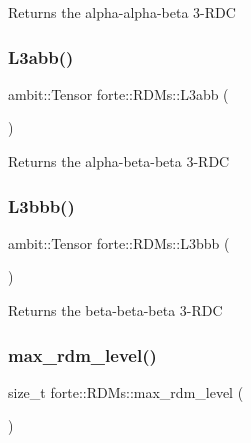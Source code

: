 \begin{DoxyReturn}{Returns}
the alpha-\/alpha-\/beta 3-\/\+R\+DC 
\end{DoxyReturn}
\mbox{\label{classforte_1_1_r_d_ms_a6e86cf45f7e726c9c9a71848d1d6bfa7}} 
\subsubsection{\texorpdfstring{L3abb()}{L3abb()}}
{\footnotesize\ttfamily ambit\+::\+Tensor forte\+::\+R\+D\+Ms\+::\+L3abb (\begin{DoxyParamCaption}{ }\end{DoxyParamCaption})}

\begin{DoxyReturn}{Returns}
the alpha-\/beta-\/beta 3-\/\+R\+DC 
\end{DoxyReturn}
\mbox{\label{classforte_1_1_r_d_ms_af93f2491070637b6411891a07b078baf}} 
\subsubsection{\texorpdfstring{L3bbb()}{L3bbb()}}
{\footnotesize\ttfamily ambit\+::\+Tensor forte\+::\+R\+D\+Ms\+::\+L3bbb (\begin{DoxyParamCaption}{ }\end{DoxyParamCaption})}

\begin{DoxyReturn}{Returns}
the beta-\/beta-\/beta 3-\/\+R\+DC 
\end{DoxyReturn}
\mbox{\label{classforte_1_1_r_d_ms_a4040065ede146dd33fadd2f8350bfcc1}} 
\subsubsection{\texorpdfstring{max\+\_\+rdm\+\_\+level()}{max\_rdm\_level()}}
{\footnotesize\ttfamily size\+\_\+t forte\+::\+R\+D\+Ms\+::max\+\_\+rdm\+\_\+level (\begin{DoxyParamCaption}{ }\end{DoxyParamCaption})\hspace{0.3cm}{\ttfamily [inline]}}

